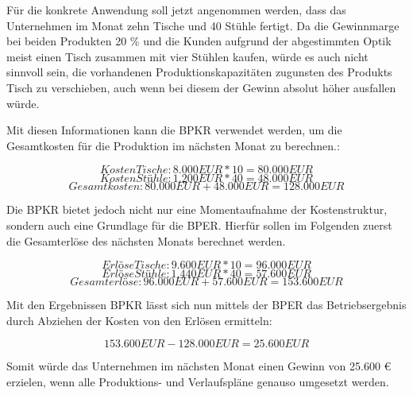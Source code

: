 Für die konkrete Anwendung soll jetzt angenommen werden, dass das Unternehmen im Monat zehn Tische und 40 Stühle fertigt. Da die Gewinnmarge bei beiden Produkten 20 \% und die Kunden aufgrund der abgestimmten Optik meist einen Tisch zusammen mit vier Stühlen kaufen, würde es auch nicht sinnvoll sein, die vorhandenen Produktionskapazitäten zugunsten des Produkts Tisch zu verschieben, auch wenn bei diesem der Gewinn absolut höher ausfallen würde.

Mit diesen Informationen kann die BPKR verwendet werden, um die Gesamtkosten für die Produktion im nächsten Monat zu berechnen.:

\[ Kosten Tische: 8.000 EUR * 10 = 80.000 EUR \]
\[ Kosten Stühle: 1.200 EUR * 40 = 48.000 EUR \]
\[ Gesamtkosten: 80.000 EUR + 48.000 EUR = 128.000 EUR \]

Die BPKR bietet jedoch nicht nur eine Momentaufnahme der Kostenstruktur, sondern auch eine Grundlage für die BPER. Hierfür sollen im Folgenden zuerst die Gesamterlöse des nächsten Monats berechnet werden.

\[ Erlöse Tische: 9.600 EUR * 10 = 96.000 EUR \]
\[ Erlöse Stühle: 1.440 EUR * 40 = 57.600 EUR \]
\[ Gesamterlöse: 96.000 EUR + 57.600 EUR = 153.600 EUR \]

Mit den Ergebnissen BPKR lässt sich nun mittels der BPER das Betriebsergebnis durch Abziehen der Kosten von den Erlösen ermitteln:

\[ 153.600 EUR - 128.000 EUR = 25.600 EUR \]

Somit würde das Unternehmen im nächsten Monat einen Gewinn von 25.600 {\euro} erzielen, wenn alle Produktions- und Verlaufspläne genauso umgesetzt werden.